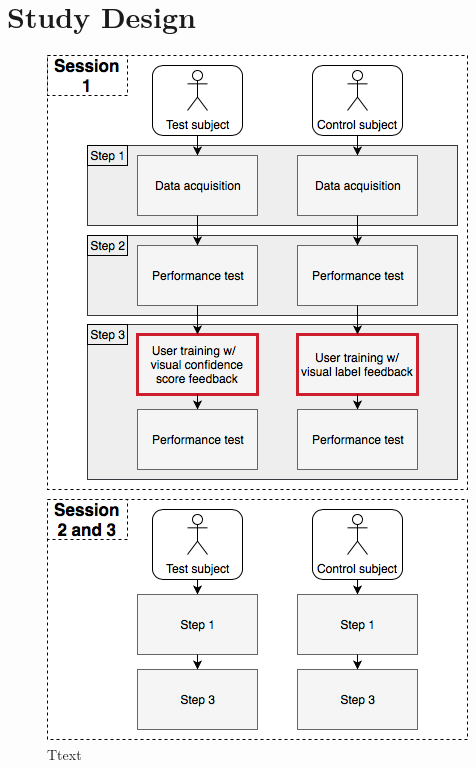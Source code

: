 \section{Study Design}

\begin{figure}[H]                                         
	\includegraphics[width=.64\textwidth]{figures/pMethods/Study_design}  
	\caption{Ttext}
	\label{fig:motor} 
\end{figure}  